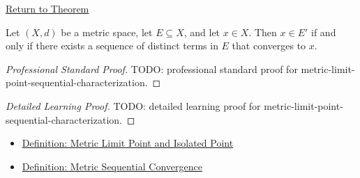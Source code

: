 \newpage
{}
\label{prf:metric-limit-point-sequential-characterization}

\begin{remark*}[Return]
\hyperref[thm:metric-limit-point-sequential-characterization]{Return to Theorem}
\end{remark*}

\begin{theorem*}
Let \((X,d)\) be a metric space, let \(E\subseteq X\), and let \(x\in X\).
Then \(x\in E'\) if and only if there exists a sequence of distinct terms in
\(E\) that converges to \(x\).
\end{theorem*}

\begin{proof}[Professional Standard Proof]
\LRAProofBodyStart
TODO: professional standard proof for metric-limit-point-sequential-characterization.
\end{proof}

\begin{proof}[Detailed Learning Proof]
\LRAProofBodyStart
TODO: detailed learning proof for metric-limit-point-sequential-characterization.
\end{proof}

\begin{remark*}
\end{remark*}

\begin{dependencies}
\begin{itemize}
  \item \hyperref[def:metric-limit-point-isolated-point]{Definition: Metric Limit Point and Isolated Point}
  \item \hyperref[def:metric-sequential-convergence]{Definition: Metric Sequential Convergence}
\end{itemize}
\end{dependencies}

\clearpage
